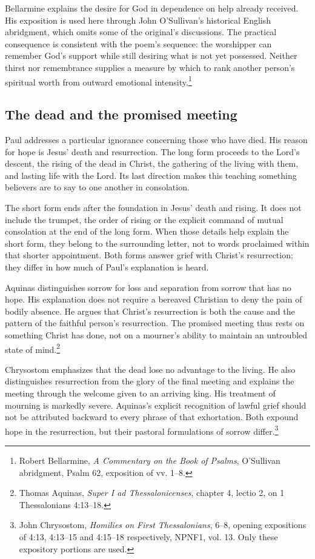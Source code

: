 Bellarmine explains the desire for God in dependence on help already received. His exposition is used here through John O'Sullivan's historical English abridgment, which omits some of the original's discussions. The practical consequence is consistent with the poem's sequence: the worshipper can remember God's support while still desiring what is not yet possessed. Neither thirst nor remembrance supplies a measure by which to rank another person's spiritual worth from outward emotional intensity.\footnote{Robert Bellarmine, \textit{A Commentary on the Book of Psalms}, O'Sullivan abridgment, Psalm 62, exposition of vv. 1--8.}

\subsection{The dead and the promised meeting}
Paul addresses a particular ignorance concerning those who have died. His reason for hope is Jesus' death and resurrection. The long form proceeds to the Lord's descent, the rising of the dead in Christ, the gathering of the living with them, and lasting life with the Lord. Its last direction makes this teaching something believers are to say to one another in consolation.

The short form ends after the foundation in Jesus' death and rising. It does not include the trumpet, the order of rising or the explicit command of mutual consolation at the end of the long form. When those details help explain the short form, they belong to the surrounding letter, not to words proclaimed within that shorter appointment. Both forms answer grief with Christ's resurrection; they differ in how much of Paul's explanation is heard.

Aquinas distinguishes sorrow for loss and separation from sorrow that has no hope. His explanation does not require a bereaved Christian to deny the pain of bodily absence. He argues that Christ's resurrection is both the cause and the pattern of the faithful person's resurrection. The promised meeting thus rests on something Christ has done, not on a mourner's ability to maintain an untroubled state of mind.\footnote{Thomas Aquinas, \textit{Super I ad Thessalonicenses}, chapter 4, lectio 2, on 1 Thessalonians 4:13--18.}

Chrysostom emphasizes that the dead lose no advantage to the living. He also distinguishes resurrection from the glory of the final meeting and explains the meeting through the welcome given to an arriving king. His treatment of mourning is markedly severe. Aquinas's explicit recognition of lawful grief should not be attributed backward to every phrase of that exhortation. Both expound hope in the resurrection, but their pastoral formulations of sorrow differ.\footnote{John Chrysostom, \textit{Homilies on First Thessalonians}, 6--8, opening expositions of 4:13, 4:13--15 and 4:15--18 respectively, NPNF1, vol. 13. Only these expository portions are used.}

